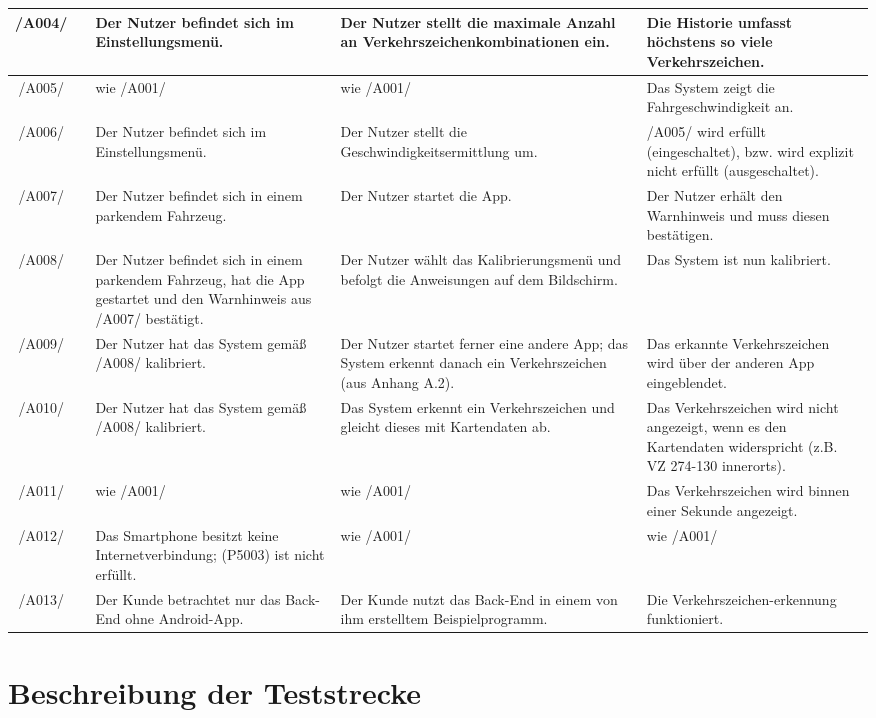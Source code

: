 \documentclass[12pt,a4paper,ngerman,enabledeprecatedfontcommands,landscape]{scrreprt}
\begin{document}
\begin{longtabu}{|c|X[0.25cm,p,c]|X[0.75cm,p,j]|X[j]|X[0.6cm,p,j]|}
\hline
/A004/ &  & Der Nutzer befindet sich im Einstellungsmenü. & Der Nutzer stellt die maximale Anzahl an Verkehrszeichenkombinationen ein. & Die Historie umfasst höchstens so viele Verkehrszeichen. \\
\hline
/A005/ &  & wie /A001/ & wie /A001/ & Das System zeigt die Fahrgeschwindigkeit an.\\
\hline
/A006/&  & Der Nutzer befindet sich im Einstellungsmenü. & Der Nutzer stellt die Geschwindigkeitsermittlung um. & /A005/ wird erfüllt (eingeschaltet), bzw. wird explizit nicht erfüllt (ausgeschaltet).\\
\hline
/A007/&  & Der Nutzer befindet sich in einem parkendem Fahrzeug. & Der Nutzer startet die App. & Der Nutzer erhält den Warnhinweis und muss diesen bestätigen.\\
\hline
/A008/&  & Der Nutzer befindet sich in einem parkendem Fahrzeug, hat die App gestartet und den Warnhinweis aus /A007/ bestätigt. & Der Nutzer wählt das Kalibrierungsmenü und befolgt die Anweisungen auf dem Bildschirm. & Das System ist nun kalibriert. \\
\hline
/A009/&  & Der Nutzer hat das System gemäß /A008/ kalibriert. & Der Nutzer startet ferner eine andere App; das System erkennt danach ein Verkehrszeichen (aus Anhang A.2). & Das erkannte Verkehrszeichen wird über der anderen App eingeblendet. \\
\hline
/A010/&  & Der Nutzer hat das System gemäß /A008/ kalibriert. & Das System erkennt ein Verkehrszeichen und gleicht dieses mit Kartendaten ab. & Das Verkehrszeichen wird nicht angezeigt, wenn es den Kartendaten widerspricht (z.B. VZ 274-130 innerorts). \\
\hline
/A011/&  & wie /A001/ & wie /A001/ & Das Verkehrszeichen wird binnen einer Sekunde angezeigt.\\
\hline
/A012/&  & Das Smartphone besitzt keine Internetverbindung; (P5003) ist nicht erfüllt. & wie /A001/& wie /A001/ \\
\hline
/A013/&  & Der Kunde betrachtet nur das Back-End ohne Android-App. & Der Kunde nutzt das Back-End in einem von ihm erstelltem Beispielprogramm. & Die Verkehrszeichen-erkennung funktioniert.\\
\hline
\end{longtabu}

\section{Beschreibung der Teststrecke}
\label{subsec:abnahmeteststrecke}
\end{document}

